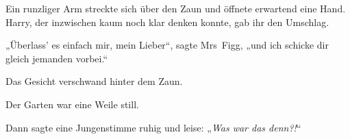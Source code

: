 Ein runzliger Arm streckte sich über den Zaun und öffnete erwartend eine Hand. Harry, der inzwischen kaum noch klar denken konnte, gab ihr den Umschlag.

„Überlass’ es einfach mir, mein Lieber“, sagte Mrs~Figg, „und ich schicke dir gleich jemanden vorbei.“

Das Gesicht verschwand hinter dem Zaun.

Der Garten war eine Weile still.

Dann sagte eine Jungenstimme ruhig und leise:
„\emph{Was war das denn?!}“
